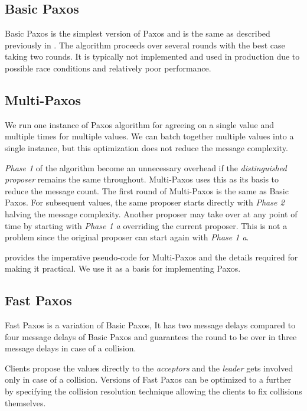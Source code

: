 \subsection{Basic Paxos}

Basic Paxos is the simplest version of Paxos and is the same as described
previously in . The algorithm proceeds over several rounds
with the best case taking two rounds. It is typically not implemented and used
in production due to possible race conditions and relatively poor performance.

\subsection{Multi-Paxos}

We run one instance of Paxos algorithm for agreeing on a single value and
multiple times for multiple values. We can batch together multiple values
into a single instance, but this optimization does not reduce the message
complexity.

\emph{Phase 1} of the algorithm become
an unnecessary overhead if the \emph{distinguished proposer} remains the same
throughout. Multi-Paxos uses this as its basis to reduce the message count.
The first round of Multi-Paxos \citep{dumulti} is the same as Basic Paxos.
For subsequent values, the same
proposer starts directly with \emph{Phase 2} halving the message complexity.
Another proposer may take over at any point of time by starting with
\emph{Phase 1 a} overriding the current proposer. This is not a problem since
the original proposer can start again with \emph{Phase 1 a}.

\citet{Robbert2011} provides the imperative pseudo-code for Multi-Paxos and
the details required for making it practical. We use it as a
basis for implementing Paxos.

\subsection{Fast Paxos}

Fast Paxos \citep{MSRTR2005112} is a variation of Basic Paxos, It has two
message delays compared to four message delays of Basic Paxos and guarantees
the round to be over in three message delays in case of a collision.

Clients propose the values directly to the \emph{acceptors} and the
\emph{leader} gets involved only in case of a collision. Versions of Fast
Paxos can be optimized to a further by specifying the collision
resolution technique allowing the clients to fix collisions themselves.

